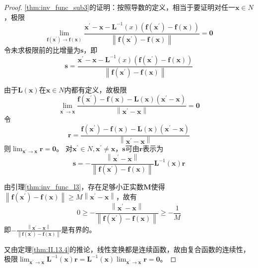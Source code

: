 \documentclass[main.tex]{subfiles}
\begin{document}
\begin{proof}
\ref{thm:inv_func_sub3}的证明：按照导数的定义，相当于要证明对任一$\mathbf{x}\in N$，极限
\[\lim_{\mathbf{f}\left(\mathbf{x}^\prime\right)\to\mathbf{f}\left(\mathbf{x}\right)}\frac{\mathbf{x}^\prime-\mathbf{x}-\mathbf{L}^{-1}\left(x\right)\left(\mathbf{f}\left(\mathbf{x}^\prime\right)-\mathbf{f}\left(\mathbf{x}\right)\right)}{\left\|\mathbf{f}\left(\mathbf{x}^\prime\right)-\mathbf{f}\left(\mathbf{x}\right)\right\|}=\mathbf{0}\]
令未求极限前的比增量为$\mathbf{s}$，即
\[\mathbf{s}=\frac{\mathbf{x}^\prime-\mathbf{x}-\mathbf{L}^{-1}\left(x\right)\left(\mathbf{f}\left(\mathbf{x}^\prime\right)-\mathbf{f}\left(\mathbf{x}\right)\right)}{\left\|\mathbf{f}\left(\mathbf{x}^\prime\right)-\mathbf{f}\left(\mathbf{x}\right)\right\|}\]

由于$\mathbf{L}\left(\mathbf{x}\right)$在$\mathbf{x}\in N$内都有定义，故极限
\[\lim_{\mathbf{x}^\prime\to\mathbf{x}}\frac{\mathbf{f}\left(\mathbf{x}^\prime\right)-\mathbf{f}\left(\mathbf{x}\right)-\mathbf{L}\left(\mathbf{x}\right)\left(\mathbf{x}^\prime-\mathbf{x}\right)}{\left\|\mathbf{x}^\prime-\mathbf{x}\right\|}=\mathbf{0}\]
令
\[\mathbf{r}=\frac{\mathbf{f}\left(\mathbf{x}^\prime\right)-\mathbf{f}\left(\mathbf{x}\right)-\mathbf{L}\left(\mathbf{x}\right)\left(\mathbf{x}^\prime-\mathbf{x}\right)}{\left\|\mathbf{x}^\prime-\mathbf{x}\right\|}\]
则$\lim_{\mathbf{x}^\prime\to\mathbf{x}}\mathbf{r}=\mathbf{0}$。
对$\mathbf{x}^\prime\in N,\mathbf{x}^\prime\neq\mathbf{x}$，$\mathbf{s}$可由$\mathbf{r}$表示为
\[
\mathbf{s}=-\frac{\left\|\mathbf{x}^\prime-\mathbf{x}\right\|}{\left\|\mathbf{f}\left(\mathbf{x}^\prime\right)-\mathbf{f}\left(\mathbf{x}\right)\right\|}\mathbf{L}^{-1}\left(\mathbf{x}\right)\mathbf{r}
\]

由引理\ref{thm:inv_func_l3}，存在足够小正实数$\mathbf{M}$使得$\left\|\mathbf{f}\left(\mathbf{x}^\prime\right)-\mathbf{f}\left(\mathbf{x}\right)\right\|\geq M\left\|\mathbf{x}^\prime-\mathbf{x}\right\|$，故有
\[0\geq-\frac{\left\|\mathbf{x}^\prime-\mathbf{x}\right\|}{\left\|\mathbf{f}\left(\mathbf{x}^\prime\right)-\mathbf{f}\left(\mathbf{x}\right)\right\|}\geq-\frac{1}{M}\]
即$-\frac{\left\|\mathbf{x}^\prime-\mathbf{x}\right\|}{\left\|\mathbf{f}\left(\mathbf{x}^\prime\right)-\mathbf{f}\left(\mathbf{x}\right)\right\|}$是有界的。

又由定理\ref{thm:II.13.4}的推论，线性变换都是连续函数，故由复合函数的连续性，极限$\lim_{\mathbf{x}^\prime\to\mathbf{x}}\mathbf{L}^{-1}\left(\mathbf{x}\right)\mathbf{r}=\mathbf{L}^{-1}\left(\mathbf{x}\right)\lim_{\mathbf{x}^\prime\to\mathbf{x}}\mathbf{r}=\mathbf{0}$。


\end{proof}
\end{document}
